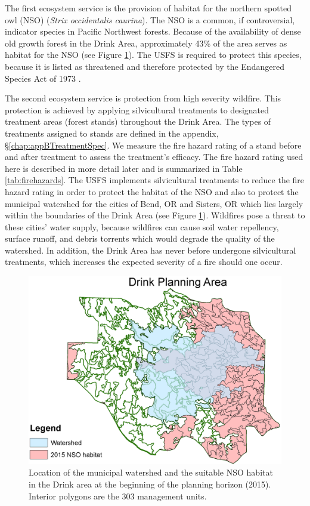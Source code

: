The first ecosystem service is the provision of habitat for the northern spotted owl (NSO) (\textit{Strix occidentalis caurina}). The NSO is a common, if controversial, indicator species in Pacific Northwest forests. Because of the availability of dense old growth forest in the Drink Area, approximately 43\% of the area serves as habitat for the NSO (see Figure \ref{fig:drinkOwlAndWatershed}). The USFS is required to protect this species, because it is listed as threatened and therefore protected by the Endangered Species Act of 1973 \cite{congress1973endangered}.

The second ecosystem service is protection from high severity wildfire. This protection is achieved by applying silvicultural treatments to designated treatment areas (forest stands) throughout the Drink Area. The types of treatments assigned to stands are defined in the appendix, \S \ref{chap:appBTreatmentSpec}. We measure the fire hazard rating of a stand before and after treatment to assess the treatment's efficacy. The fire hazard rating used here is described in more detail later and is summarized in Table \ref{tab:firehazards}. The USFS implements silvicultural treatments to reduce the fire hazard rating in order to protect the habitat of the NSO and also to protect the municipal watershed for the cities of Bend, OR and Sisters, OR which lies largely within the boundaries of the Drink Area (see Figure \ref{fig:drinkOwlAndWatershed}). Wildfires pose a threat to these cities' water supply, because wildfires can cause soil water repellency, surface runoff, and debris torrents \cite{ice2004effects} which would degrade the quality of the watershed. In addition, the Drink Area has never before undergone silvicultural treatments, which increases the expected severity of a fire should one occur. 
\begin{figure}
\centering
\includegraphics[width=.5\textwidth]{../images/DrinkMap_NSOAndWatershed}
\caption[NSO Habitat and municipal watershed in the Drink Planning Area]{Location of the municipal watershed and the suitable NSO habitat in the Drink area at the beginning of the planning horizon (2015). Interior polygons are the 303 management units.}
\label{fig:drinkOwlAndWatershed}
\end{figure}

